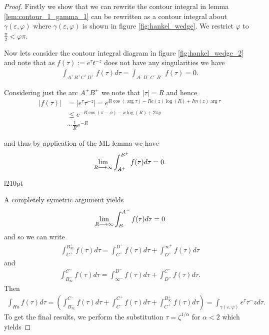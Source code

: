 \begin{proof}

Firstly we show that we can rewrite the contour integral in lemma \ref{lem:contour_1_gamma_1} can be rewritten as a contour
integral about $ \gamma(\varepsilon, \varphi) $ where $ \gamma(\varepsilon, \varphi) $ is shown in figure \ref{fig:hankel_wedge}. We restrict $ \varphi $ to $ \frac{\pi}{2} < \varphi \pi $. 

Now lets consider the contour integral diagram in figure \ref{fig:hankel_wedge_2} and note that as $ f(\tau) := e^\tau t^{-z} $ does not have any singularities we have
\begin{align*}
    \int_{A^+ B^+ C^+ D^+} f(\tau) d\tau = \int_{A^-D^-C^-B^-} f(\tau) = 0.
\end{align*}

Considering just the arc $ A^+B^+ $ we note that $ |\tau| = R $ and hence
\begin{align*}
    |f(\tau)| &= |e^\tau \tau^{-z}| = e^{R\cos(\arg \tau) - Re(z) \log(R) + Im(z) \arg \tau} \\
      &\leq e^{-R\cos(\pi - \phi) - x \log(R) + 2 \pi y} \\
      &\sim \frac{1}{R}e^{-R}
\end{align*}

and thus by application of the ML lemma we have
\begin{align*}
    \lim_{R \longrightarrow \infty} \int_{A^+}^{B^+} f(\tau) d\tau = 0.
\end{align*}

\begin{wrapfigure}{l}{210pt}
    
    \caption{The Hankel countour $ \gamma(\varepsilon, \varphi) $}
    \label{fig:hankel_wedge}
\end{wrapfigure}

A completely symetric argument yields
\begin{align*}
    \lim_{R \longrightarrow \infty} \int_{B^-}^{A^-} f(\tau) d\tau = 0
\end{align*}
and so we can write
\begin{align*}
    \int_{C^+}^{B_\infty^+} f(\tau)d\tau = \int_{C^+}^{D^+} f(\tau)d\tau + \int_{D^+}^{\infty^+} f(\tau)d\tau
\end{align*}
and
\begin{align*}
    \int_{B_\infty^-}^{C^-} f(\tau)d\tau = \int_{\infty^-}^{D^-} f(\tau)d\tau + \int_{D^-}^{C^-} f(\tau)d\tau.
\end{align*}
Then
\begin{align*}
    \int_{Ha} f(\tau) d\tau = \left( \int_{B_\infty^-}^{C^-} f(\tau)d\tau + \int_{C^-}^{C^+} f(\tau)d\tau +  \int_{C^+}^{B_\infty^+} f(\tau)d\tau \right) = \int_{\gamma(\varepsilon, \varphi)}e^\tau \tau^-z d\tau.
\end{align*}
To get the final results, we perform the substitution $ \tau = \zeta^{1/\alpha} $ for $ \alpha < 2 $
which yields


\end{proof}

